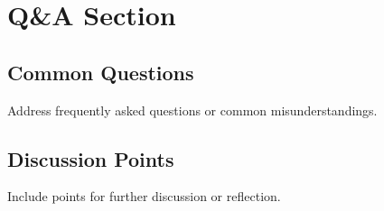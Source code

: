 \section{Q\&A Section}
\subsection*{Common Questions}
Address frequently asked questions or common misunderstandings.
\subsection*{Discussion Points}
Include points for further discussion or reflection.
